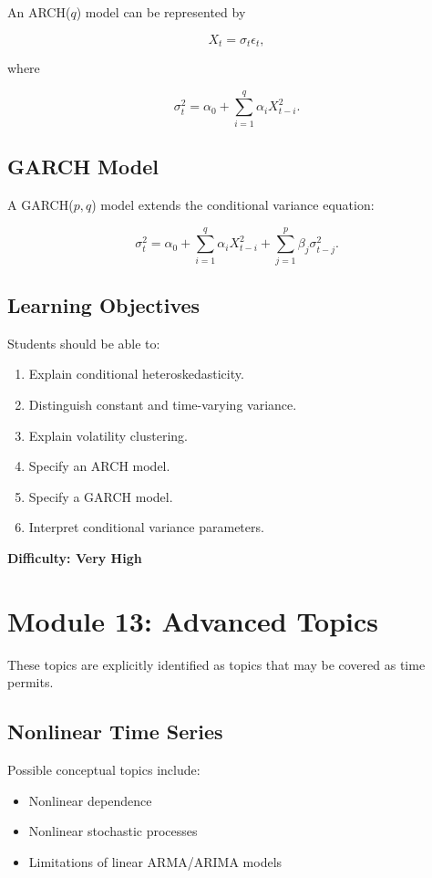 \documentclass[11pt]{article}
\begin{document}
An ARCH($q$) model can be represented by

\[
X_t = \sigma_t\epsilon_t,
\]

where

\[
\sigma_t^2
=
\alpha_0
+
\sum_{i=1}^{q}
\alpha_iX_{t-i}^2.
\]

\subsection{GARCH Model}

A GARCH($p,q$) model extends the conditional variance equation:

\[
\sigma_t^2
=
\alpha_0
+
\sum_{i=1}^{q}\alpha_i X_{t-i}^2
+
\sum_{j=1}^{p}\beta_j\sigma_{t-j}^2.
\]

\subsection{Learning Objectives}

Students should be able to:

\begin{enumerate}
    \item Explain conditional heteroskedasticity.
    \item Distinguish constant and time-varying variance.
    \item Explain volatility clustering.
    \item Specify an ARCH model.
    \item Specify a GARCH model.
    \item Interpret conditional variance parameters.
\end{enumerate}

\textbf{Difficulty: Very High}

\section{Module 13: Advanced Topics}

These topics are explicitly identified as topics that may be covered
as time permits.

\subsection{Nonlinear Time Series}

Possible conceptual topics include:

\begin{itemize}
    \item Nonlinear dependence
    \item Nonlinear stochastic processes
    \item Limitations of linear ARMA/ARIMA models
\end{itemize}
\end{document}
